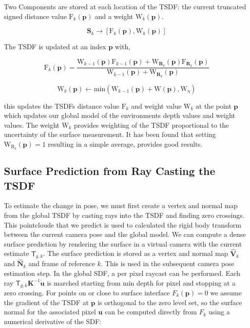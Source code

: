 \documentclass[10pt, twocolumn]{article}
\begin{document}
Two Components are stored at each location of the TSDF: the current truncated signed distance value $\mathrm{F}_{k}(\mathbf{p})$ and a weight $\mathrm{W}_k(\mathbf{p})$.

\begin{equation}
\mathbf{S}_{k} \rightarrow [\mathrm{F}_{k}(\mathbf{p}), \mathrm{W}_{k}(\mathbf{p})]
\end{equation}

The TSDF is updated at an index $\mathbf{p}$ with,

\begin{equation}
\mathrm{F}_k(\mathbf{p}) = \frac{\mathrm{W}_{k-1}(\mathbf{p}) \mathrm{F}_{k-1}(\mathbf{p}) + \mathrm{W}_{\mathbf{R}_k}(\mathbf{p}) \mathrm{F}_{\mathbf{R}_k}(\mathbf{p})}{\mathrm{W}_{k-1}(\mathbf{p}) + \mathrm{W}_{\mathbf{R}_k}(\mathbf{p})}
\end{equation}

\begin{equation}
\mathrm{W}_k (\mathbf{p}) \leftarrow \mathrm{min} (\mathrm{W}_{k-1} (\mathbf{p}) + \mathrm{W} (\mathbf{p}), \mathrm{W}_{\eta})
\end{equation}

this updates the TSDFs distance value $\mathrm{F}_k$ and weight value $\mathrm{W}_k$ at the point $\mathbf{p}$ which updates our global model of the environments depth values and weight values. The weight $\mathrm{W}_k$ provides weighting of the TSDF proportional to the uncertainty of the surface measurement. It has been found that setting $\mathrm{W}_{\mathrm{R}_k} (\mathbf{p}) = 1$ resulting in a simple average, provides good results. 

\subsection{Surface Prediction from Ray Casting the TSDF}
To estimate the change in pose, we must first create a vertex and normal map from the global TSDF by casting rays into the TSDF and finding zero crossings. This pointcloude that we predict is used to calculated the rigid body transform between the current camera pose and the global model.
We can compute a dense surface prediction by rendering the surface in a virtual camera with the current estimate $\mathsf{T}_{g,k}$. 
The surface prediction is stored as a vertex and normal map $\hat{\mathbf{V}}_{k}$ and $\hat{\mathbf{N}}_{k}$ and frame of reference $k$.
This is used in the subsequent camera pose estimation step.
In the global SDF, a per pixel raycast can be performed. Each ray $\mathsf{T}_{g,k}\mathbf{K}^{-1}\mathbf{\dot{u}}$ is marched starting from min depth for pixel and stopping at a zero crossing.
For points on or close to surface interface $F_{k}(\mathbf{p}) = 0$ we assume the gradient of the TSDF at $\mathbf{p}$ is orthogonal to the zero level set, so the surface normal for the associated pixel $\mathbf{u}$ can be computed directly from $F_{k}$ using a numerical derivative of the SDF:
\end{document}
